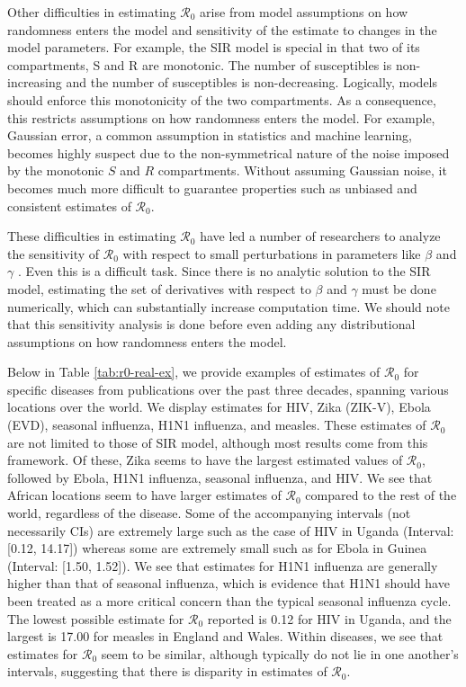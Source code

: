 \documentclass[12pt]{article}
\newcommand{\rr}{\ensuremath{\mathcal{R}_0}}
\begin{document}
Other difficulties in estimating $\rr$ arise from model assumptions on how randomness enters the model and sensitivity of the estimate to changes in the model parameters.  For example, the SIR model is special in that two of its compartments, S and R are monotonic.  The number of susceptibles is non-increasing and the number of susceptibles is non-decreasing.  Logically, models should enforce this monotonicity of the two compartments.  As a consequence, this restricts assumptions on how randomness enters the model.  For example, Gaussian error, a common assumption in statistics and machine learning, becomes highly suspect due to the non-symmetrical nature of the noise imposed by the monotonic $S$ and $R$ compartments.  Without assuming Gaussian noise, it becomes much more difficult to guarantee properties such as unbiased and consistent estimates of $\rr$.

These difficulties in estimating $\rr$ have led a number of researchers to analyze the sensitivity of $\rr$ with respect to small perturbations in parameters like $\beta$ and $\gamma$ \citep{lash2003,epstein2007agent,capaldi2012}.  Even this is a difficult task. Since there is no analytic solution to the SIR model, estimating the set of derivatives with respect to $\beta$ and $\gamma$ must be done numerically, which can substantially increase computation time.  We should note that this sensitivity analysis is done before even adding any distributional assumptions on how randomness enters the model.

Below in Table \ref{tab:r0-real-ex}, we provide examples of estimates of $\rr$ for specific diseases from publications over the past three decades, spanning various locations over the world.  We display estimates for HIV, Zika (ZIK-V), Ebola (EVD), seasonal influenza, H1N1 influenza, and measles.  These estimates of $\rr$ are not limited to those of SIR model, although most results come from this framework.  Of these, Zika seems to have the largest estimated values of $\rr$, followed by Ebola, H1N1 influenza, seasonal influenza, and HIV.  We see that African locations seem to have larger estimates of $\rr$ compared to the rest of the world, regardless of the disease.  Some of the accompanying intervals (not necessarily CIs) are extremely large such as the case of HIV in Uganda (Interval: [0.12, 14.17]) whereas some are extremely small such as for Ebola in Guinea (Interval: [1.50, 1.52]).  We see that estimates for H1N1 influenza are generally higher than that of seasonal influenza, which is evidence that H1N1 should have been treated as a more critical concern than the typical seasonal influenza cycle.  The lowest possible estimate for $\rr$ reported is 0.12 for HIV in Uganda, and the largest is 17.00 for measles in England and Wales.  Within diseases, we see that estimates for $\rr$ seem to be similar, although typically do not lie in one another's intervals, suggesting that there is disparity in estimates of $\rr$.
\end{document}
